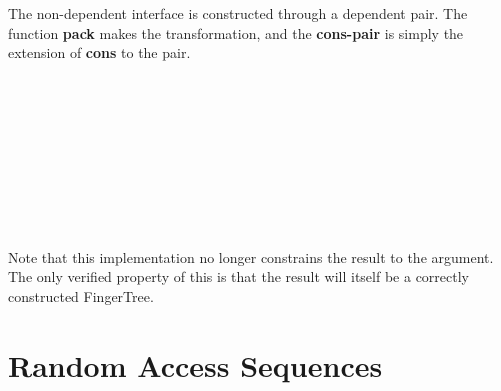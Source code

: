 \documentclass[12pt,twoside,notitlepage]{report}
\begin{document}
The non-dependent interface is constructed through a dependent pair. The function \textbf{pack} makes the transformation, and the \textbf{cons-pair} is simply the extension of \textbf{cons} to the pair.
\begin{code}
\\
\> \AgdaSymbol{:}  \AgdaSymbol{\{}\AgdaSymbol{\}} \AgdaSymbol{\{} \AgdaSymbol{:}  \AgdaSymbol{\}} \AgdaSymbol{\{} \AgdaSymbol{:}  \AgdaSymbol{\}}\<%
\\
\>[2]\<[10]%
\>[10]  \AgdaSymbol{:}   \<%
\\
\>[2]\<[10]%
\>[10]  \AgdaSymbol{:}    \<%
\\
\>[2]\<[10]%
\>[10] \AgdaSymbol{(}        \AgdaSymbol{\{}\AgdaSymbol{\}))}\<%
\\
\>[2]\<[10]%
\>[10] \AgdaSymbol{(}        \AgdaSymbol{\{}\AgdaSymbol{\}))}\<%
\\
\> \AgdaSymbol{\{}\AgdaSymbol{\}} \AgdaSymbol{\{}\AgdaSymbol{\}} \AgdaSymbol{\{}\AgdaSymbol{\}}  \AgdaSymbol{=}\<%
\\
\>[0]\<[2]%
\>[2]  \AgdaSymbol{(} \AgdaSymbol{\{} \AgdaSymbol{=} \AgdaSymbol{\}} \AgdaSymbol{\{} \AgdaSymbol{=} \AgdaSymbol{\}} \AgdaSymbol{)} \<%
\\
%
\end{code} 

Note that this implementation no longer constrains the result to the argument. The only verified property of this is that the result will itself be a correctly constructed FingerTree.

\section{Random Access Sequences}
\end{document}
